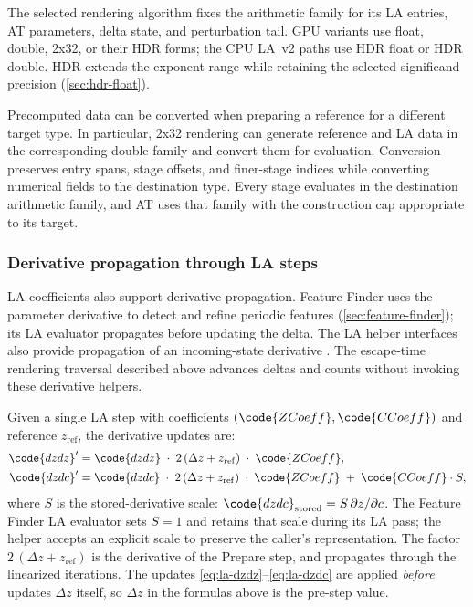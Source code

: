 The selected rendering algorithm fixes the arithmetic family for its
LA entries, AT parameters, delta state, and perturbation tail. GPU
variants use float, double, 2x32, or their HDR forms; the CPU LA~v2
paths use HDR float or HDR double. HDR extends the exponent range
while retaining the selected significand precision
(\cref{sec:hdr-float}).

Precomputed data can be converted when preparing a reference for a
different target type. In particular, 2x32 rendering can generate
reference and LA data in the corresponding double family and convert
them for evaluation. Conversion preserves entry spans, stage offsets,
and finer-stage indices while converting numerical fields to the
destination type. Every stage evaluates in the destination arithmetic
family, and AT uses that family with the construction cap appropriate
to its target.

\subsubsection{Derivative propagation through LA steps}
\label{sec:la-derivatives}

LA coefficients also support derivative propagation. Feature Finder
uses the parameter derivative to detect and refine periodic features
(\cref{sec:feature-finder}); its LA evaluator propagates
 before updating the delta. The LA helper interfaces also
provide propagation of an incoming-state derivative .
The escape-time rendering traversal described above advances deltas
and counts without invoking these derivative helpers.

Given a single LA step with coefficients
\((\code{ZCoeff}, \code{CCoeff})\) and reference \(z_\mathrm{ref}\), the
derivative updates are:
\begin{align}
\code{dzdz}' &= \code{dzdz}
  \;\cdot\; 2\,(\Delta z + z_\mathrm{ref})
  \;\cdot\; \code{ZCoeff},
\label{eq:la-dzdz}
\\
\code{dzdc}' &= \code{dzdc}
  \;\cdot\; 2\,(\Delta z + z_\mathrm{ref})
  \;\cdot\; \code{ZCoeff}
  \;+\; \code{CCoeff} \cdot S,
\label{eq:la-dzdc}
\end{align}
where $S$ is the stored-derivative scale:
$\code{dzdc}_{\mathrm{stored}}=S\,\partial z/\partial c$.
The Feature Finder LA evaluator sets $S=1$ and retains that scale
during its LA pass; the helper accepts an explicit scale to preserve
the caller's representation.
The factor \(2\,(\Delta z + z_\mathrm{ref})\) is the derivative of the
Prepare step, and  propagates through the linearized
iterations.  The updates \eqref{eq:la-dzdz}--\eqref{eq:la-dzdc} are applied \emph{before}
 updates \(\Delta z\) itself, so \(\Delta z\) in the
formulas above is the pre-step value.

